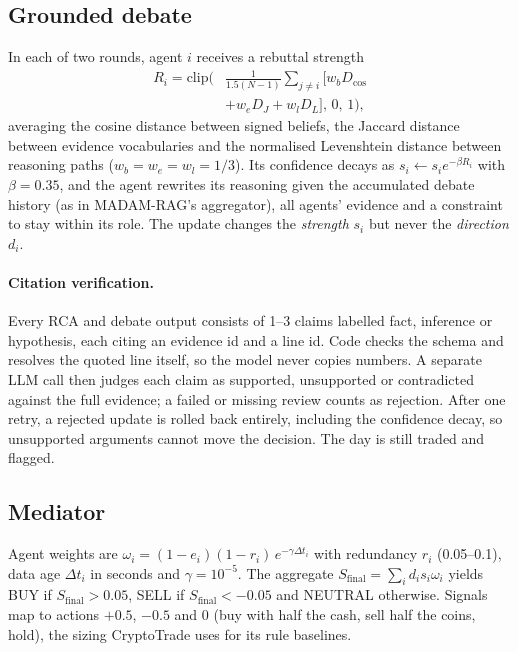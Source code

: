 \documentclass[11pt]{article}
\newcommand{\Sfinal}{S_{\text{final}}}
\begin{document}
\subsection{Grounded debate}
In each of two rounds, agent $i$ receives a rebuttal strength
\begin{equation}
\begin{aligned}
R_i=\mathrm{clip}\Big(&\tfrac{1}{1.5(N-1)}\textstyle\sum_{j\neq i}\big[w_b D_{\cos}\\
&+w_e D_{J}+w_l D_{L}\big],\,0,\,1\Big),
\end{aligned}
\end{equation}
averaging the cosine distance between signed beliefs, the Jaccard distance between evidence vocabularies and the
normalised Levenshtein distance between reasoning paths ($w_b=w_e=w_l=1/3$). Its confidence decays as
$s_i\leftarrow s_i e^{-\beta R_i}$ with $\beta=0.35$, and the agent rewrites its reasoning given the accumulated debate
history (as in MADAM-RAG's aggregator), all agents' evidence and a constraint to stay within its role. The update changes
the \emph{strength} $s_i$ but never the \emph{direction} $d_i$.

\paragraph{Citation verification.}
Every RCA and debate output consists of 1--3 claims labelled fact, inference or hypothesis, each citing an evidence id
and a line id. Code checks the schema and resolves the quoted line itself, so the model never copies numbers. A
separate LLM call then judges each claim as supported, unsupported or contradicted against the full evidence; a failed
or missing review counts as rejection. After one retry, a rejected update is rolled back entirely, including the
confidence decay, so unsupported arguments cannot move the decision. The day is still traded and flagged.

\subsection{Mediator}
Agent weights are $\omega_i=(1-e_i)(1-r_i)\,e^{-\gamma\Delta t_i}$ with redundancy $r_i$ (0.05--0.1), data age
$\Delta t_i$ in seconds and $\gamma=10^{-5}$. The aggregate $\Sfinal=\sum_i d_i s_i\omega_i$ yields BUY if
$\Sfinal>0.05$, SELL if $\Sfinal<-0.05$ and NEUTRAL otherwise. Signals map to actions $+0.5$, $-0.5$ and $0$ (buy with
half the cash, sell half the coins, hold), the sizing CryptoTrade uses for its rule baselines.
\end{document}
